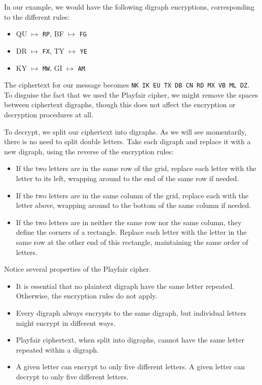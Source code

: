 \documentclass{book}
\theoremstyle{plain}
\theoremstyle{definition}
\newcommand{\ciphertext}[1]{\texttt{#1}} %
\begin{document}
In our example, we would have the following digraph encryptions, corresponding to the different rules:
\begin{itemize}
\item QU $\mapsto$ \ciphertext{RP}, BF $\mapsto$ \ciphertext{FG}
\item DR $\mapsto$ \ciphertext{FX}, TY $\mapsto$ \ciphertext{YE}
\item KY $\mapsto$ \ciphertext{MW}, GI $\mapsto$ \ciphertext{AM}
\end{itemize}

The ciphertext for our message becomes \ciphertext{NK IK EU TX DB CN RD MX VB ML DZ}. To disguise the fact that we used the Playfair cipher, we might remove the spaces between ciphertext digraphs, though this does not affect the encryption or decryption procedures at all.

To decrypt, we split our ciphertext into digraphs. As we will see momentarily, there is no need to split double letters. Take each digraph and replace it with a new digraph, using the reverse of the encryption rules:
\begin{itemize}
\item If the two letters are in the same row of the grid, replace each letter with the letter to its left, wrapping around to the end of the same row if needed.
\item If the two letters are in the same column of the grid, replace each with the letter above, wrapping around to the bottom of the same column if needed.
\item If the two letters are in neither the same row nor the same column, they define the corners of a rectangle. Replace each letter with the letter in the same row at the other end of this rectangle, maintaining the same order of letters.
\end{itemize}

Notice several properties of the Playfair cipher.
\begin{itemize}
\item It is essential that no plaintext digraph have the same letter repeated. Otherwise, the encryption rules do not apply.
\item Every digraph always encrypts to the same digraph, but individual letters might encrypt in different ways.
\item Playfair ciphertext, when split into digraphs, cannot have the same letter repeated within a digraph.
\item A given letter can encrypt to only five different letters. A given letter can decrypt to only five different letters.
\end{itemize}
\end{document}
